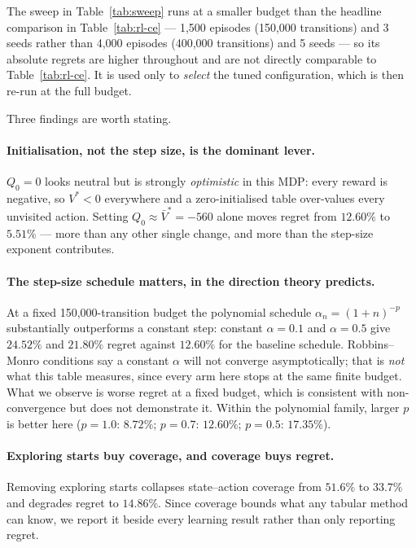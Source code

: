 The sweep in Table~\ref{tab:sweep} runs at a smaller budget than the headline comparison in
Table~\ref{tab:rl-ce} --- 1{,}500 episodes (150{,}000 transitions) and 3 seeds rather than
4{,}000 episodes (400{,}000 transitions) and 5 seeds --- so its absolute regrets are higher
throughout and are not directly comparable to Table~\ref{tab:rl-ce}. It is used only to
\emph{select} the tuned configuration, which is then re-run at the full budget.

Three findings are worth stating.

\paragraph{Initialisation, not the step size, is the dominant lever.} $Q_0 = 0$ looks neutral but is
strongly \emph{optimistic} in this MDP: every reward is negative, so $V^{*} < 0$ everywhere and a
zero-initialised table over-values every unvisited action. Setting $Q_0 \approx \bar{V}^{*} = -560$
alone moves regret from $12.60\%$ to $5.51\%$ --- more than any other single change, and more than
the step-size exponent contributes.

\paragraph{The step-size schedule matters, in the direction theory predicts.} At a fixed
150,000-transition budget the polynomial schedule $\alpha_n = (1+n)^{-p}$ substantially outperforms
a constant step: constant $\alpha = 0.1$ and $\alpha = 0.5$ give $24.52\%$ and $21.80\%$ regret
against $12.60\%$ for the baseline schedule. Robbins--Monro conditions say a constant $\alpha$ will
not converge asymptotically; that is \emph{not} what this table measures, since every arm here
stops at the same finite budget. What we observe is worse regret at a fixed budget, which is
consistent with non-convergence but does not demonstrate it.
Within the polynomial family, larger $p$ is better here ($p = 1.0$: $8.72\%$; $p = 0.7$: $12.60\%$;
$p = 0.5$: $17.35\%$).

\paragraph{Exploring starts buy coverage, and coverage buys regret.} Removing exploring starts
collapses state--action coverage from $51.6\%$ to $33.7\%$ and degrades regret to $14.86\%$. Since
coverage bounds what any tabular method can know, we report it beside every learning result rather
than only reporting regret.


